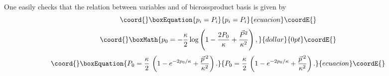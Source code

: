 \documentclass [prd,twocolumn,nofootinbib,showpacs]  {revtex4}
\begin{document}
One
easily checks that the relation between variables \coordHE{} and
\coordHE{} of bicrossproduct basis is given by
\begin{equation}\coord{}\boxEquation{\label{13}
p_{i} = P_{i}
}{p_{i} = P_{i}
}{ecuacion}\coordE{}\end{equation}
$$\coord{}\boxMath{
p_0 = - \frac\kappa2\log\left(1 - \frac{2P_0}{\kappa} + \frac{\vec{P}{}^2}{\kappa^2}\right),
}{dollar}{0pt}\coordE{}$$
\begin{equation}\coord{}\boxEquation{\label{14}
 P_0 = \frac\kappa2\,\left(1 -  e^{-2p_0/\kappa} + \frac{\vec{p}\,{}^2}{\kappa^2}\right).
}{P_0 = \frac\kappa2\,\left(1 -  e^{-2p_0/\kappa} + \frac{\vec{p}\,{}^2}{\kappa^2}\right).
}{ecuacion}\coordE{}\end{equation}
\end{document}
